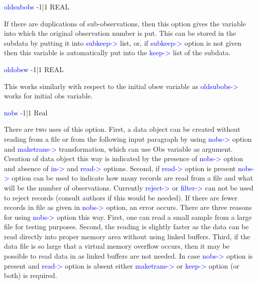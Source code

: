 \vspace{0.3cm}
\hline
\vspace{0.3cm}
\noindent \textcolor{blue}{oldsubobs} \tabto{3cm} -1|1 \tabto{5cm}   REAL \tabto{7cm}
\begin{changemargin}{3cm}{0cm}
\noindent  If there are duplications of sub-observations, then this option gives the variable
into which the original observation number is put. This can be stored in the
subdata by putting it into \textcolor{blue}{subkeep->} list, or, if \textcolor{blue}{subkeep->} option is not given
then this variable is automatically put into the \textcolor{blue}{keep->} list of the subdata.

\end{changemargin}
\vspace{0.3cm}
\hline
\vspace{0.3cm}
\noindent \textcolor{blue}{oldobsw} \tabto{3cm} -1|1 \tabto{5cm}  REAL \tabto{7cm}
\begin{changemargin}{3cm}{0cm}
\noindent  This works similarly with respect to the initial obsw variable as \textcolor{blue}{oldsubobs->}
works for initial obs variable.

\end{changemargin}
\vspace{0.3cm}
\hline
\vspace{0.3cm}
\noindent \textcolor{blue}{nobs} \tabto{3cm} -1|1 \tabto{5cm}  Real \tabto{7cm}
\begin{changemargin}{3cm}{0cm}
\noindent  There are two uses of this option. First, a data object can be created without reading
from a file or from the following input paragraph by using \textcolor{blue}{nobs->} option and
\textcolor{blue}{maketrans->} transformation, which can use Obs variable as argument. Creation
of data object this way is indicated by the presence of \textcolor{blue}{nobs->} option and absence
of \textcolor{blue}{in->} and \textcolor{blue}{read->} options. Second, if \textcolor{blue}{read->} option is present \textcolor{blue}{nobs->}
option can be used to indicate how many records are read from a file and what
will be the number of observations. Currently \textcolor{blue}{reject->} or \textcolor{blue}{filter->} can not
be used to reject records (consult authors if this would be needed). If there are
fewer records in file as given in \textcolor{blue}{nobs->} option, an error occurs. There are three
reasons for using \textcolor{blue}{nobs->} option this way. First, one can read a small sample
from a large file for testing purposes. Second, the reading is slightly faster as the
data can be read directly into proper memory area without using linked buffers.
Third, if the data file is so large that a virtual memory overflow occurs, then it may
be possible to read data in as linked buffers are not needed.
In case \textcolor{blue}{nobs->} option is present and \textcolor{blue}{read->} option is absent either
\textcolor{blue}{maketrans->} or \textcolor{blue}{keep->} option (or both) is required.
\end{changemargin}
